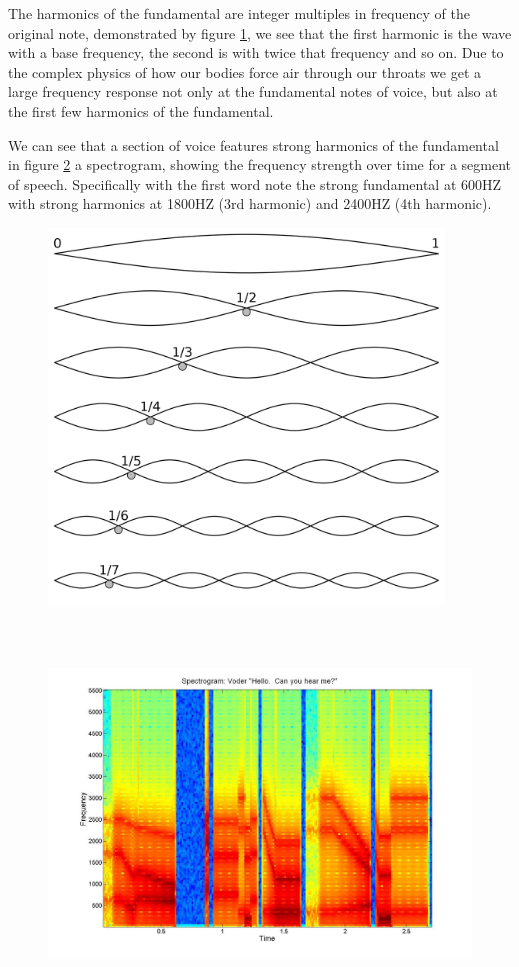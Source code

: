 \documentclass[ %
                    author={Sam Phippen},
                supervisor={Dr. Rafal Bogacz},
                     title={Real time voice activity detectors in noisy personal computing environments},
                  subtitle={},
                    degree={MEng},
                      year={2012} ]{thesis}
\begin{document}
The harmonics of the fundamental are integer multiples in frequency of the
original note, demonstrated by figure \ref{img:harmonics}, we see that the
first harmonic is the wave with a base frequency, the second is with twice that
frequency and so on. Due to the complex physics of how our bodies force air through
our throats we get a large frequency response not only at the fundamental notes
of voice, but also at the first few harmonics of the fundamental.

We can see that a section of voice features strong harmonics of the fundamental
in figure \ref{img:spectrogram} a spectrogram, showing the frequency strength
over time for a segment of speech. Specifically with the first word note the
strong fundamental at 600HZ with strong harmonics at 1800HZ (3rd harmonic) and
2400HZ (4th harmonic).

\begin{figure}
    \includegraphics[height=10cm]{harmonics.png}
    \label{img:harmonics}
\end{figure}

\begin{figure}
    \includegraphics[height=10cm]{voder_spectrogram.jpg}
    \label{img:spectrogram}
\end{figure}
\end{document}
